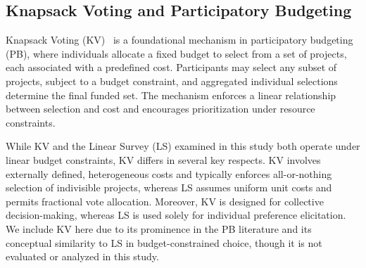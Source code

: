 \subsection{Knapsack Voting and Participatory Budgeting}
Knapsack Voting (KV)~\cite{goelKnapsackVotingVoting, goelBudgetAggregationKnapsack} is a foundational mechanism in participatory budgeting (PB), where individuals allocate a fixed budget to select from a set of projects, each associated with a predefined cost. Participants may select any subset of projects, subject to a budget constraint, and aggregated individual selections determine the final funded set. The mechanism enforces a linear relationship between selection and cost and encourages prioritization under resource constraints.

While KV and the Linear Survey (LS) examined in this study both operate under linear budget constraints, KV differs in several key respects. KV involves externally defined, heterogeneous costs and typically enforces all-or-nothing selection of indivisible projects, whereas LS assumes uniform unit costs and permits fractional vote allocation. Moreover, KV is designed for collective decision-making, whereas LS is used solely for individual preference elicitation. We include KV here due to its prominence in the PB literature and its conceptual similarity to LS in budget-constrained choice, though it is not evaluated or analyzed in this study.



